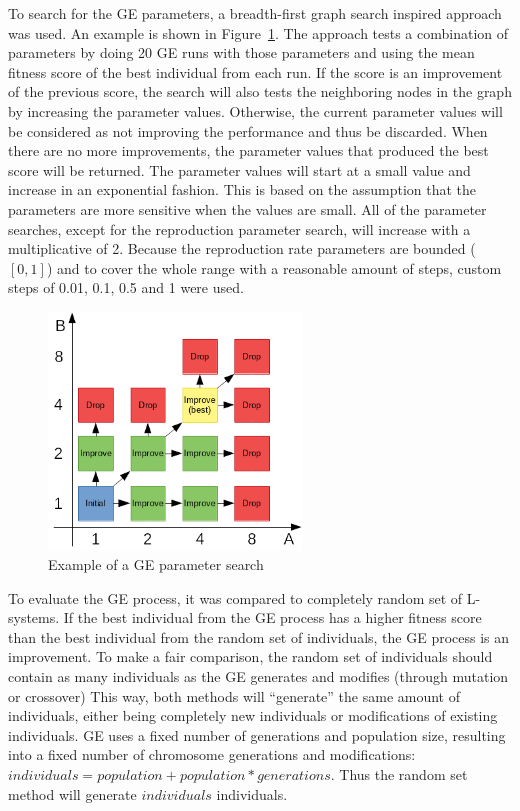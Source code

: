 To search for the GE parameters, a breadth-first graph search inspired approach was used.
An example is shown in Figure~\ref{fig:parameter-search}.
The approach tests a combination of parameters by doing 20 GE runs with those parameters and using the mean fitness score of the best individual from each run.
If the score is an improvement of the previous score, the search will also tests the neighboring nodes in the graph by increasing the parameter values.
Otherwise, the current parameter values will be considered as not improving the performance and thus be discarded.
When there are no more improvements, the parameter values that produced the best score will be returned.
The parameter values will start at a small value and increase in an exponential fashion.
This is based on the assumption that the parameters are more sensitive when the values are small.
All of the parameter searches, except for the reproduction parameter search, will increase with a multiplicative of 2.
Because the reproduction rate parameters are bounded ($[0, 1]$) and to cover the whole range with a reasonable amount of steps, custom steps of 0.01, 0.1, 0.5 and 1 were used.

\begin{figure}
    \centering
    \includegraphics[width=0.6\textwidth]{figures/parameter-search}
    \caption{Example of a GE parameter search}
    \label{fig:parameter-search}
\end{figure}

To evaluate the GE process, it was compared to completely random set of L-systems.
If the best individual from the GE process has a higher fitness score than the best individual from the random set of individuals, the GE process is an improvement.
To make a fair comparison, the random set of individuals should contain as many individuals as the GE generates and modifies (through mutation or crossover)
This way, both methods will ``generate'' the same amount of individuals, either being completely new individuals or modifications of existing individuals.
GE uses a fixed number of generations and population size, resulting into a fixed number of chromosome generations and modifications: $individuals = population + population * generations$.
Thus the random set method will generate $individuals$ individuals.

